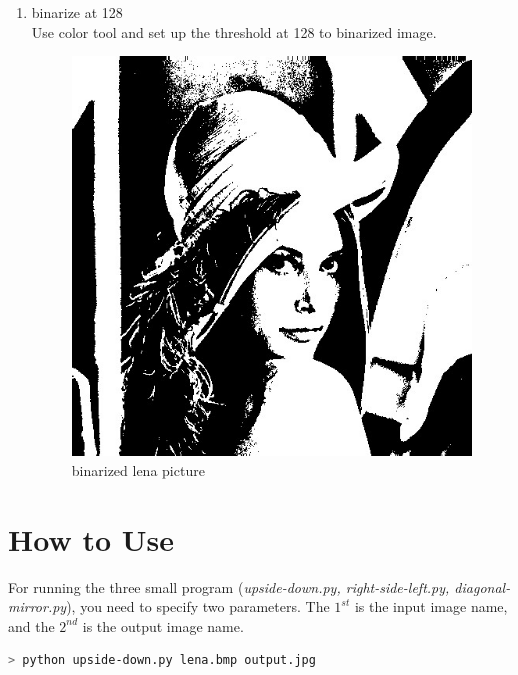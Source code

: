 \documentclass[12pt,twoside,a4paper]{article}
\begin{document}
\begin{enumerate}
  \item binarize at 128\\
    Use color tool and set up the threshold at 128 to binarized image.
    \begin{figure}[H]
    \centering
    \includegraphics[scale=0.4]{lena-binarized.jpg}
    \caption{binarized lena picture}
    \label{fig:lena-binarized.jpg}
    \end{figure}
\end{enumerate}

\section{How to Use}
For running the three small program (\textit{upside-down.py, right-side-left.py, diagonal-mirror.py}), you need to specify two parameters. The $1^{st}$ is the input image name, and the $2^{nd}$ is the output image name.
\begin{lstlisting}[language=Bash]
> python upside-down.py lena.bmp output.jpg
\end{lstlisting}
\end{document}
